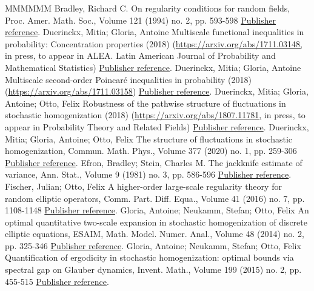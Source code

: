 \documentclass[11pt]{article}
\theoremstyle{definition}
\numberwithin{equation}{section}
\numberwithin{figure}{section}
\numberwithin{table}{section}
\begin{document}
\begin{thebibliography}{MMMMMM}
 Bradley, Richard C. On regularity conditions for random fields, Proc. Amer. Math. Soc., Volume 121 (1994) no. 2, pp. 593-598 \href{https://ahl.centre-mersenne.org/item/AHL_2020__3__825_0/#Bradley-94}{Publisher reference}.
 Duerinckx, Mitia; Gloria, Antoine Multiscale functional inequalities in probability: Concentration properties (2018) (\url{https://arxiv.org/abs/1711.03148,} in press, to appear in ALEA. Latin American Journal of Probability and Mathematical Statistics) \href{https://ahl.centre-mersenne.org/item/AHL_2020__3__825_0/#DG1}{Publisher reference}.
 Duerinckx, Mitia; Gloria, Antoine Multiscale second-order Poincaré inequalities in probability (2018) (\url{https://arxiv.org/abs/1711.03158}) \href{https://ahl.centre-mersenne.org/item/AHL_2020__3__825_0/#DG3}{Publisher reference}.
 Duerinckx, Mitia; Gloria, Antoine; Otto, Felix Robustness of the pathwise structure of fluctuations in stochastic homogenization (2018) (\url{https://arxiv.org/abs/1807.11781,} in press, to appear in Probability Theory and Related Fields) \href{https://ahl.centre-mersenne.org/item/AHL_2020__3__825_0/#DGO2}{Publisher reference}.
 Duerinckx, Mitia; Gloria, Antoine; Otto, Felix The structure of fluctuations in stochastic homogenization, Commun. Math. Phys., Volume 377 (2020) no. 1, pp. 259-306 \href{https://ahl.centre-mersenne.org/item/AHL_2020__3__825_0/#DGO1}{Publisher reference}.
 Efron, Bradley; Stein, Charles M. The jackknife estimate of variance, Ann. Stat., Volume 9 (1981) no. 3, pp. 586-596 \href{https://ahl.centre-mersenne.org/item/AHL_2020__3__825_0/#Efron-Stein-81}{Publisher reference}.
 Fischer, Julian; Otto, Felix A higher-order large-scale regularity theory for random elliptic operators, Comm. Part. Diff. Equa., Volume 41 (2016) no. 7, pp. 1108-1148 \href{https://ahl.centre-mersenne.org/item/AHL_2020__3__825_0/#Fischer-Otto-16}{Publisher reference}.
 Gloria, Antoine; Neukamm, Stefan; Otto, Felix An optimal quantitative two-scale expansion in stochastic homogenization of discrete elliptic equations, ESAIM, Math. Model. Numer. Anal., Volume 48 (2014) no. 2, pp. 325-346 \href{https://ahl.centre-mersenne.org/item/AHL_2020__3__825_0/#Glotto-Neukamm-14}{Publisher reference}.
 Gloria, Antoine; Neukamm, Stefan; Otto, Felix Quantification of ergodicity in stochastic homogenization: optimal bounds via spectral gap on Glauber dynamics, Invent. Math., Volume 199 (2015) no. 2, pp. 455-515 \href{https://ahl.centre-mersenne.org/item/AHL_2020__3__825_0/#GNO-I}{Publisher reference}.

\end{thebibliography}
\end{document}
